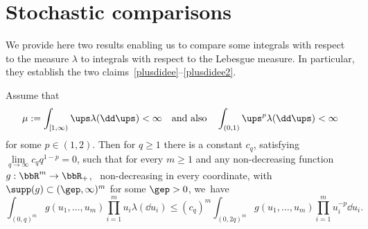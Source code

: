 \section{Stochastic comparisons}

We provide here
two results enabling us to compare some integrals
with respect to the measure $\lambda$ to integrals with respect
to the Lebesgue measure.
In particular, they establish the two claims~\eqref{plusdidee}--\eqref{plusdidee2}.

\begin{proposition}
\label{prop:compare1}
Assume that
\[
\mu:=\int_{[1,\infty)} \ups \lambda(\dd \ups) <\infty\quad\text{and also}\quad \int_{(0,1)} \ups^p \lambda(\dd \ups) <\infty
\]
for some $p \in (1,2)$. Then for $q\geq 1$ there is
a constant $c_q$, satisfying $\lim\limits_{q\to\infty} c_q q^{1-p} =0$,
such that for every $m\geq 1$ and any non-decreasing function $g:\bbR^m \to \bbR_+$, \ie \ non-decreasing in every coordinate, with $\supp(g)\subset (\gep,\infty)^m$ for some $\gep>0$, we~have
\[
\int_{(0,q)^m} g(u_1, \ldots, u_m) \prod_{i=1}^m u_i \lambda(\dd u_i) \leq (c_q)^m \int_{(0,2q)^m} g(u_1, \ldots, u_m) \prod_{i=1}^m u_i^{-p} \dd u_i.
\]
\end{proposition}

